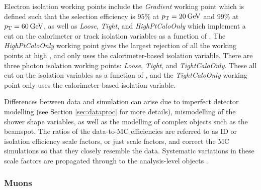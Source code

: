 Electron isolation working points include the \textit{Gradient} working point which is defined such that the selection efficiency is $95\%$ at $p_{\text{T}} = 20\hspace{2pt}\text{Ge\kern -0.1em V}$ and $99\%$ at $p_{\text{T}} = 60\hspace{2pt}\text{Ge\kern -0.1em V}$, as well as \textit{Loose}, \textit{Tight}, and \textit{HighPtCaloOnly} which implement a cut on the calorimeter or track isolation variables as a function of \pt. The \textit{HighPtCaloOnly} working point gives the largest rejection of all the working points at high \pt, and only uses the calorimeter-based isolation variable. There are three photon isolation working points: \textit{Loose}, \textit{Tight}, and \textit{TightCaloOnly}. These all cut on the isolation variables as a function of \et, and the \textit{TightCaloOnly} working point only uses the calorimeter-based isolation variable. 

Differences between data and simulation can arise due to imperfect detector modelling (see Section \ref{sec:dataproc} for more details), mismodelling of the shower shape variables, as well as the modelling of complex objects such as the beamspot. The ratios of the data-to-MC efficiencies are referred to as ID or isolation efficiency scale factors, or just scale factors, and correct the MC simulations so that they closely resemble the data. Systematic variations in these scale factors are propagated through to the analysis-level objects \cite{Atlas:photonid_run2}.



\subsubsection{Muons\label{sec:muon}}
 
